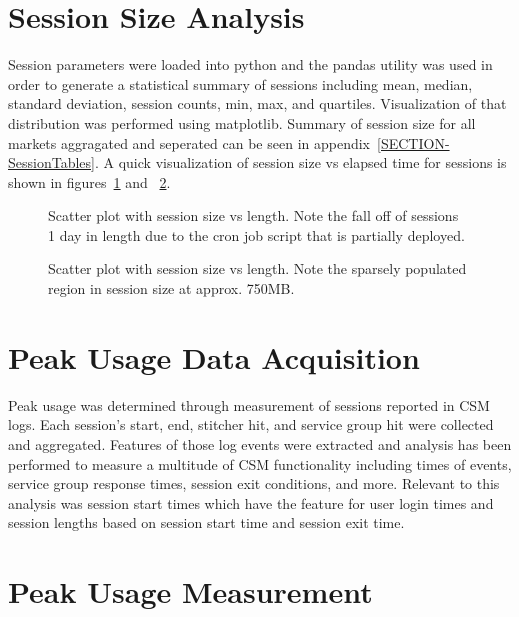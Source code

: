 \documentclass{article}
\begin{document}
\section{Session Size Analysis}

Session parameters were loaded into python and the pandas utility was used in order to generate a statistical summary of sessions including mean, median, standard deviation, session counts, min, max, and quartiles. Visualization of that distribution was performed using matplotlib. Summary of session size for all markets aggragated and seperated can be seen in appendix~\ref{SECTION-SessionTables}. A quick visualization of session size vs elapsed time for sessions is shown in figures~\ref{FIGURE-SizeVsLenth} and ~\ref{FIGURE-SizeVsLengthZoomed}. 

\begin{figure}[!htb]
        \caption{\label{FIGURE-SizeVsLenth} Scatter plot with session size vs length. Note the fall off of sessions $\>$ 1 day in length due to the cron job script that is partially deployed.}
      \end{figure}

\begin{figure}[!htb]
        \caption{\label{FIGURE-SizeVsLengthZoomed} Scatter plot with session size vs length. Note the sparsely populated region in session size at approx. 750MB.}
      \end{figure}



\section{Peak Usage Data Acquisition}

Peak usage was determined through measurement of sessions reported in CSM logs. Each session's start, end, stitcher hit, and service group hit were collected and aggregated. Features of those log events were extracted and analysis has been performed to measure a multitude of CSM functionality including times of events, service group response times, session exit conditions, and more. Relevant to this analysis was session start times which have the feature for user login times and session lengths based on session start time and session exit time. 



\section{Peak Usage Measurement}
\end{document}

